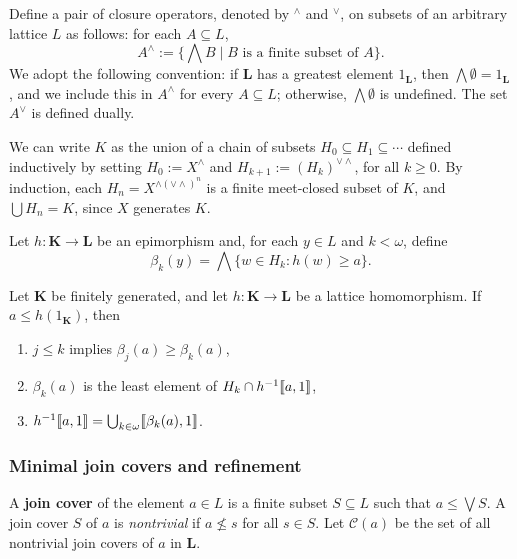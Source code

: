 Define a pair of closure operators, 
denoted by $^\wedge$ and $^\vee$, on  subsets of an arbitrary 
lattice %
$L$ as follows: for each $A\subseteq L$,
\[
A^\wedge := \{\bigwedge B \mid B \text{ is a finite subset of } A\}.
\]
We adopt the following convention: if 
$\mathbf L$ has a greatest element 
$1_{\mathbf L}$, then $\bigwedge \emptyset = 1_{\mathbf L}$, and we include 
this in $A^\wedge$ for every $A \subseteq L$; otherwise, $\bigwedge \emptyset$ is undefined.  
The set $A^\vee$ is defined dually.

We can write $K$ as the union of a chain of subsets 
$H_0\subseteq H_1 \subseteq \cdots$ defined inductively by setting 
$H_0 := X^\wedge$ and $H_{k+1} := (H_k)^{\vee \wedge}$, for all $k\geqslant 0$. 
By induction, each $H_n = X^{\wedge(\vee\wedge)^n}$ is a finite meet-closed 
subset of $K$, and $\bigcup H_n = K$, since $X$  generates $K$.

Let $h \colon \mathbf K \to \mathbf L$ be an epimorphism and, 
for each $y \in L$ and $k< \omega$, define
\[
\beta_k(y) = \bigwedge \{w \in H_k : h(w) \geqslant a\}.
\]

\begin{theorem}\label{thm:2.2}
   Let $\mathbf K$ be finitely generated, and let $h \colon \mathbf K \to \mathbf L$ be a lattice
  homomorphism. If $a \leq h(1_{\mathbf K})$, then
\begin{enumerate}
\item $j \leq k$ implies $\beta_j(a) \geq \beta_k(a)$,
\item  $\beta_k(a)$ is the least element of $H_k \cap h^{-1}\llbracket a, 1 \rrbracket$,
\item  $h^{-1}\llbracket a, 1 \rrbracket = \bigcup_{k\in \omega}\llbracket \beta_k(a), 1 \rrbracket$.
\end{enumerate}  

\end{theorem}  


\subsubsection{Minimal join covers and refinement}

A \textbf{join cover} of the element $a \in L$ is a finite
subset $S \subseteq L$ such that $a \leq \bigvee S$. 
A join cover $S$ of $a$ is \textit{nontrivial} if $a \nleq s$ for all
$s \in S$. Let $\mathcal C (a)$ be the set of all nontrivial join 
covers of $a$ in $\mathbf L$.

